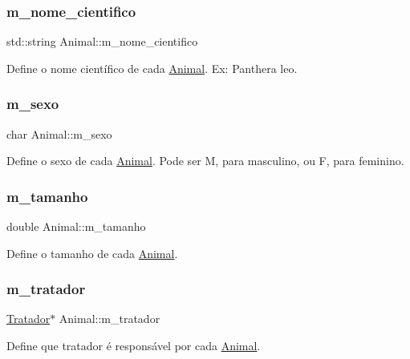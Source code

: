 \subsubsection{\texorpdfstring{m\+\_\+nome\+\_\+cientifico}{m\_nome\_cientifico}}
{\footnotesize\ttfamily std\+::string Animal\+::m\+\_\+nome\+\_\+cientifico\hspace{0.3cm}{\ttfamily [protected]}}

Define o nome científico de cada \hyperlink{classAnimal}{Animal}. Ex\+: Panthera leo. \mbox{\label{classAnimal_aaa6d77e661ed0fa9a33500588c8acfef}} 
\subsubsection{\texorpdfstring{m\+\_\+sexo}{m\_sexo}}
{\footnotesize\ttfamily char Animal\+::m\+\_\+sexo\hspace{0.3cm}{\ttfamily [protected]}}

Define o sexo de cada \hyperlink{classAnimal}{Animal}. Pode ser M, para masculino, ou F, para feminino. \mbox{\label{classAnimal_afe83ba40e79b42d06b0c95f61aaa0218}} 
\subsubsection{\texorpdfstring{m\+\_\+tamanho}{m\_tamanho}}
{\footnotesize\ttfamily double Animal\+::m\+\_\+tamanho\hspace{0.3cm}{\ttfamily [protected]}}

Define o tamanho de cada \hyperlink{classAnimal}{Animal}. \mbox{\label{classAnimal_a1d9b76d126f6d72374f94d4d359e0ea7}} 
\subsubsection{\texorpdfstring{m\+\_\+tratador}{m\_tratador}}
{\footnotesize\ttfamily \hyperlink{classTratador}{Tratador}$\ast$ Animal\+::m\+\_\+tratador\hspace{0.3cm}{\ttfamily [protected]}}

Define que tratador é responsável por cada \hyperlink{classAnimal}{Animal}. \mbox{\label{classAnimal_a3b95df9484483642a10cafcafc15961d}} 
